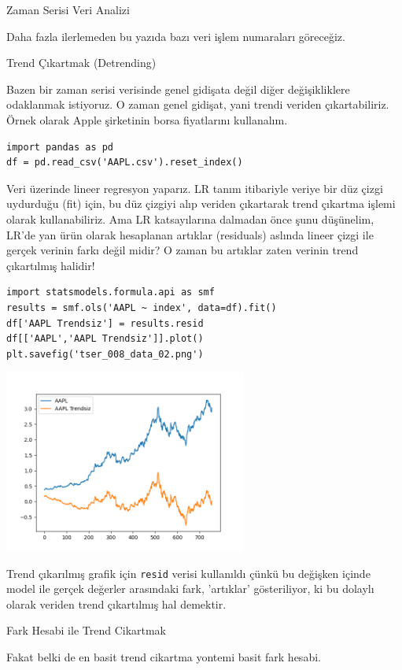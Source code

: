 \documentclass[12pt,fleqn]{article}\usepackage{../../common}
\begin{document}
Zaman Serisi Veri Analizi

Daha fazla ilerlemeden bu yazıda bazı veri işlem numaraları göreceğiz.

Trend Çıkartmak (Detrending)

Bazen bir zaman serisi verisinde genel gidişata değil diğer değişikliklere
odaklanmak istiyoruz. O zaman genel gidişat, yani trendi veriden
çıkartabiliriz. Örnek olarak Apple şirketinin borsa fiyatlarını kullanalım.

\begin{verbatim}
import pandas as pd
df = pd.read_csv('AAPL.csv').reset_index()
\end{verbatim}

Veri üzerinde lineer regresyon yaparız. LR tanım itibariyle veriye bir düz çizgi
uydurduğu (fit) için, bu düz çizgiyi alıp veriden çıkartarak trend çıkartma
işlemi olarak kullanabiliriz. Ama LR katsayılarına dalmadan önce şunu düşünelim,
LR'de yan ürün olarak hesaplanan artıklar (residuals) aslında lineer çizgi ile
gerçek verinin farkı değil midir? O zaman bu artıklar zaten verinin trend
çıkartılmış halidir!

\begin{verbatim}
import statsmodels.formula.api as smf
results = smf.ols('AAPL ~ index', data=df).fit()
df['AAPL Trendsiz'] = results.resid
df[['AAPL','AAPL Trendsiz']].plot()
plt.savefig('tser_008_data_02.png')
\end{verbatim}

\includegraphics[height=6cm]{tser_008_data_02.png}

Trend çıkarılmış grafik için \verb!resid! verisi kullanıldı çünkü bu değişken
içinde model ile gerçek değerler arasındaki fark, 'artıklar' gösteriliyor, ki
bu dolaylı olarak veriden trend çıkartılmış hal demektir.

Fark Hesabi ile Trend Cikartmak

Fakat belki de en basit trend cikartma yontemi basit fark hesabi.
\end{document}
